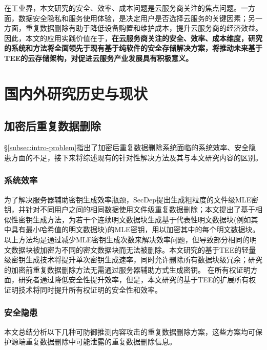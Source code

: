在工业界，本文研究的安全、效率、成本问题是云服务商关注的焦点问题。一方面，数据安全隐私和服务使用体验，是决定用户是否选择云服务的关键因素；另一方面，重复数据删除有助于降低设备购置和维护成本，提升云服务商的经济效益。因此，本文的应用实践价值在于，\textbf{在云服务商关注的安全、效率、成本维度，研究的系统和方法将全面领先于现有基于纯软件的安全存储解决方案，将推动未来基于TEE的云存储架构，对促进云服务产业发展具有积极意义。}

\section{国内外研究历史与现状}
\label{sec:compare}

\subsection{加密后重复数据删除}
\label{subsec:compare-deduplication}

\S\ref{subsec:intro-problem}指出了加密后重复数据删除系统面临的系统效率、安全隐患方面的不足，接下来将综述现有的针对性解决方法及其与本文研究内容的区别。

\subsubsection{系统效率}
\label{subsubsec:compare-deduplication-performance}

为了解决服务器辅助密钥生成效率瓶颈，SecDep\cite{zhou2015secdep}提出生成粗粒度的文件级MLE密钥，并针对不同用户之间的相同数据使用文件级重复数据删除；本文提出了基于相似性密钥生成方法\cite{qin17}，为若干个连续明文数据块生成基于代表性明文数据块(例如其中具有最小哈希值的明文数据块)的MLE密钥，用以加密其中的每个明文数据块。以上方法均是通过减少MLE密钥生成次数来解决效率问题，但导致部分相同的明文数据块被加密为不同的密文数据块而无法被删除。本文研究的基于TEE的轻量级密钥生成技术将提升单次密钥生成速率，同时允许删除所有数据块级冗余；研究的加密前重复数据删除方法无需通过服务器辅助方式生成密钥。
在所有权证明方面，研究者通过降低安全性提升效率\cite{xu2013weak,pietro12}，但是，本文研究的基于TEE的扩展所有权证明技术将同时提升所有权证明的安全性和效率。

\subsubsection{安全隐患}
\label{subsubsec:compare-deduplication-security}

本文总结分析以下几种可防御推测内容攻击的重复数据删除方案，这些方案均可保护源端重复数据删除中可能泄露的重复数据删除信息。

